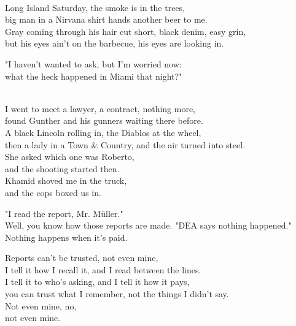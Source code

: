 \begin{lyrics}

\\
Long Island Saturday, the smoke is in the trees,\\
big man in a Nirvana shirt hands another beer to me.\\
Gray coming through his hair cut short, black denim, easy grin,\\
but his eyes ain't on the barbecue, his eyes are looking in.

"I haven't wanted to ask, but I'm worried now:\\
what the heck happened in Miami that night?"

\\
I went to meet a lawyer, a contract, nothing more,\\
found Gunther and his gunners waiting there before.\\
A black Lincoln rolling in, the Diablos at the wheel,\\
then a lady in a Town \& Country, and the air turned into steel.\\
She asked which one was Roberto,\\
and the shooting started then.\\
Khamid shoved me in the truck,\\
and the cops boxed us in.

"I read the report, Mr. Müller."
\\
Well, you know how those reports are made.
"DEA says nothing happened."
\\
Nothing happens when it's paid.

Reports can't be trusted, not even mine,\\
I tell it how I recall it, and I read between the lines.\\
I tell it to who's asking, and I tell it how it pays,\\
you can trust what I remember, not the things I didn't say.\\
Not even mine, no,\\
not even mine.


\end{lyrics}
